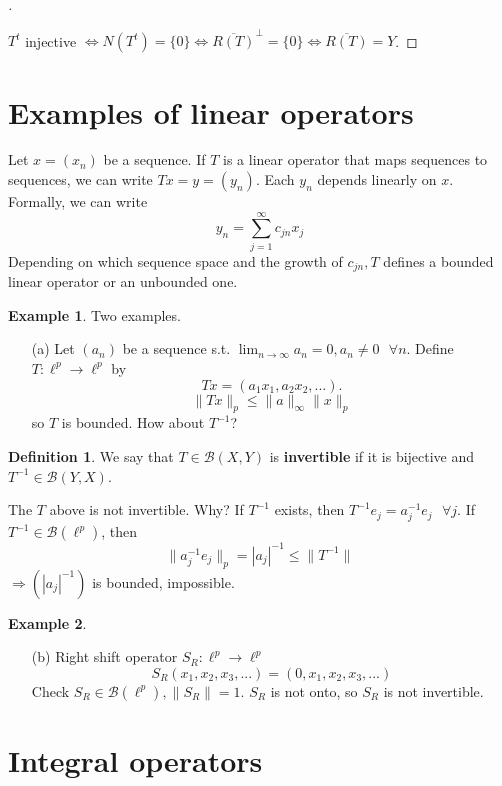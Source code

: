 \documentclass{article}
\newcommand{\sfa}{\text{  } \forall}
\theoremstyle{definition}
\newtheorem{ex}{Example}
\newtheorem{dfn}{Definition}
\newenvironment{proofs}[1][\proofname]{%
  \begin{proof}[#1]$ $\par\nobreak\ignorespaces
}{%
  \end{proof}
}
\begin{document}
\begin{proofs}
	$T^t$ injective $\Leftrightarrow N(T^t) = \{0\} \Leftrightarrow \overline{R(T)}^\perp = \{0\} \Leftrightarrow \overline{R(T)} = Y$.
\end{proofs}

\section*{Examples of linear operators}

Let $x = (x_n)$ be a sequence.
If $T$ is a linear operator that maps sequences to sequences, we can write $T x = y = (y_n)$.
Each $y_n$ depends linearly on $x$.
Formally, we can write 
\[
	y_n = \sum_{j = 1}^\infty c_{jn} x_j
\]
Depending on which sequence space and the growth of $c_{jn}, T$ defines a bounded linear operator or an unbounded one.

\begin{ex}
	Two examples.
	\begin{enumerate}
		\item[(a)] Let $(a_n)$ be a sequence s.t. $\lim_{n \to \infty} a_n = 0, a_n \neq 0 \sfa n$.
			Define $T: \ell^p \to \ell^p$ by 
			\[
				T x= (a_1 x_1, a_2x_2,...).
			\]
			\[
				\|T x\|_p \leq \|a\|_\infty \|x\|_p
			\]
			so $T$ is bounded.
			How about $T^{-1}$?
	\end{enumerate}
\end{ex}

\begin{dfn}
	We say that $T \in \mathcal{B}(X, Y)$ is \textbf{invertible} if it is bijective and $T^{-1} \in \mathcal{B}(Y, X)$.
\end{dfn}

The $T$ above is not invertible.
Why? 
If $T^{-1}$ exists, then $T^{-1} e_j = a_j^{-1} e_j \sfa j$.
If $T^{-1} \in \mathcal{B}(\ell^p)$, then
\[
	\|a_j^{-1} e_j \|_p = |a_j|^{-1} \leq \|T^{-1}\|
\]
$\Rightarrow (|a_j|^{-1})$ is bounded, impossible.

\setcounter{ex}{0}
\begin{ex}
	\begin{enumerate}
		\item[(b)] Right shift operator $S_R : \ell^p \to \ell^p$
			\[
				S_R(x_1, x_2, x_3, ...) = (0, x_1, x_2, x_3, ...)
			\]
			Check $S_R \in \mathcal{B}(\ell^p), \|S_R\| = 1$.
			$S_R$ is not onto, so $S_R$ is not invertible.
	\end{enumerate}
\end{ex}

\section*{Integral operators}
\end{document}

